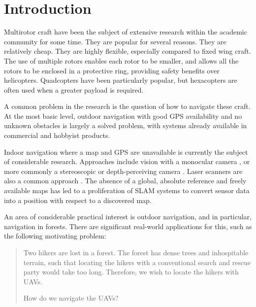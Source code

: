 \documentclass[12pt,oneside,a4paper]{book}
\begin{document}
\cleardoublepage
\pagestyle{headings}
\tableofcontents


\cleardoublepage
\pagestyle{headings}
\glsaddall
\printglossaries
\mainmatter

\chapter{Introduction}
\label{cha:intro}


Multirotor craft have been the subject of extensive research within
the academic community for some time. They are popular for several
reasons. They are relatively cheap. They are highly flexible,
especially compared to fixed wing craft. The use of multiple rotors
enables each rotor to be smaller, and allows all the rotors to be
enclosed in a protective ring, providing safety benefits over
helicopters. Quadcopters have been particularly popular, but
hexacopters are often used when a greater payload is required.

A common problem in the research is the question of how to navigate
these craft. At the most basic level, outdoor navigation with good GPS
availability and no unknown obstacles is largely a solved problem,
with systems already available in commercial and hobbyist products.

Indoor navigation where a map and GPS are unavailable is currently the
subject of considerable research. Approaches include vision with a
monocular camera \cite{5152680}, or more commonly a stereoscopic or
depth-perceiving camera \cite{huang2011visual}. Laser scanners are
also a common approach \cite{achtelik2009stereo}. The absence of a
global, absolute reference and freely available maps has led to a
proliferation of \gls{SLAM} systems to convert sensor data into a
position with respect to a discovered map.

An area of considerable practical interest is outdoor navigation, and
in particular, navigation in forests.  There are significant real-world
applications for this, such as the following motivating problem:
\begin{quote}
  Two hikers are lost in a forest. The forest has dense trees and
  inhospitable terrain, such that locating the hikers with a
  conventional search and rescue party would take too long. Therefore,
  we wish to locate the hikers with UAVs.

  How do we navigate the UAVs?
\end{quote}
\end{document}
